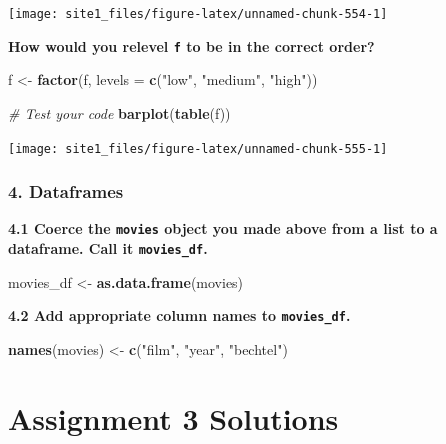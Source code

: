 \documentclass[]{book}
\newenvironment{Shaded}{\begin{snugshade}}{\end{snugshade}}
\newcommand{\CommentTok}[1]{\textcolor[rgb]{0.56,0.35,0.01}{\textit{#1}}}
\newcommand{\DataTypeTok}[1]{\textcolor[rgb]{0.13,0.29,0.53}{#1}}
\newcommand{\KeywordTok}[1]{\textcolor[rgb]{0.13,0.29,0.53}{\textbf{#1}}}
\newcommand{\NormalTok}[1]{#1}
\newcommand{\StringTok}[1]{\textcolor[rgb]{0.31,0.60,0.02}{#1}}
\begin{document}
\begin{center}\texttt{[image: site1\_files/figure-latex/unnamed-chunk-554-1]} \end{center}

\textbf{How would you relevel \texttt{f} to be in the correct order?}

\begin{Shaded}
\begin{Highlighting}[]
\NormalTok{f <-}\StringTok{ }\KeywordTok{factor}\NormalTok{(f, }\DataTypeTok{levels =} \KeywordTok{c}\NormalTok{(}\StringTok{"low"}\NormalTok{, }\StringTok{"medium"}\NormalTok{, }\StringTok{"high"}\NormalTok{))}

\CommentTok{# Test your code}
\KeywordTok{barplot}\NormalTok{(}\KeywordTok{table}\NormalTok{(f))}
\end{Highlighting}
\end{Shaded}

\begin{center}\texttt{[image: site1\_files/figure-latex/unnamed-chunk-555-1]} \end{center}

\hypertarget{dataframes-1}{%
\subsubsection*{4. Dataframes}\label{dataframes-1}}

\textbf{4.1 Coerce the \texttt{movies} object you made above from a list to a dataframe. Call it \texttt{movies\_df}.}

\begin{Shaded}
\begin{Highlighting}[]
\NormalTok{movies_df <-}\StringTok{ }\KeywordTok{as.data.frame}\NormalTok{(movies)}
\end{Highlighting}
\end{Shaded}

\textbf{4.2 Add appropriate column names to \texttt{movies\_df}.}

\begin{Shaded}
\begin{Highlighting}[]
\KeywordTok{names}\NormalTok{(movies) <-}\StringTok{ }\KeywordTok{c}\NormalTok{(}\StringTok{"film"}\NormalTok{, }\StringTok{"year"}\NormalTok{, }\StringTok{"bechtel"}\NormalTok{)}
\end{Highlighting}
\end{Shaded}

\hypertarget{assignment-3-solutions}{%
\section{Assignment 3 Solutions}\label{assignment-3-solutions}}
\end{document}
